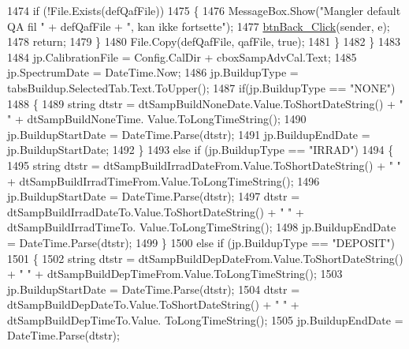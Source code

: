 \begin{DoxyCode}
1474                     \textcolor{keywordflow}{if} (!File.Exists(defQafFile))
1475                     \{
1476                         MessageBox.Show(\textcolor{stringliteral}{"Mangler default QA fil "} + defQafFile + \textcolor{stringliteral}{", kan ikke fortsette"});
1477                         \hyperlink{class_scintilab_1_1_form_main_aca32a54e95297f770c9022441cb74a90}{btnBack\_Click}(sender, e);
1478                         \textcolor{keywordflow}{return};
1479                     \}
1480                     File.Copy(defQafFile, qafFile, \textcolor{keyword}{true});
1481                 \}
1482             \}
1483 
1484             jp.CalibrationFile = Config.CalDir + cboxSampAdvCal.Text;
1485             jp.SpectrumDate = DateTime.Now;
1486             jp.BuildupType = tabsBuildup.SelectedTab.Text.ToUpper();
1487             \textcolor{keywordflow}{if}(jp.BuildupType == \textcolor{stringliteral}{"NONE"})
1488             \{
1489                 \textcolor{keywordtype}{string} dtstr = dtSampBuildNoneDate.Value.ToShortDateString() + \textcolor{stringliteral}{" "} + dtSampBuildNoneTime.
      Value.ToLongTimeString();
1490                 jp.BuildupStartDate = DateTime.Parse(dtstr);
1491                 jp.BuildupEndDate = jp.BuildupStartDate; 
1492             \}
1493             \textcolor{keywordflow}{else} \textcolor{keywordflow}{if} (jp.BuildupType == \textcolor{stringliteral}{"IRRAD"})
1494             \{
1495                 \textcolor{keywordtype}{string} dtstr = dtSampBuildIrradDateFrom.Value.ToShortDateString() + \textcolor{stringliteral}{" "} + 
      dtSampBuildIrradTimeFrom.Value.ToLongTimeString();
1496                 jp.BuildupStartDate = DateTime.Parse(dtstr);
1497                 dtstr = dtSampBuildIrradDateTo.Value.ToShortDateString() + \textcolor{stringliteral}{" "} + dtSampBuildIrradTimeTo.
      Value.ToLongTimeString();
1498                 jp.BuildupEndDate = DateTime.Parse(dtstr);
1499             \}
1500             \textcolor{keywordflow}{else} \textcolor{keywordflow}{if} (jp.BuildupType == \textcolor{stringliteral}{"DEPOSIT"})
1501             \{
1502                 \textcolor{keywordtype}{string} dtstr = dtSampBuildDepDateFrom.Value.ToShortDateString() + \textcolor{stringliteral}{" "} + 
      dtSampBuildDepTimeFrom.Value.ToLongTimeString();
1503                 jp.BuildupStartDate = DateTime.Parse(dtstr);
1504                 dtstr = dtSampBuildDepDateTo.Value.ToShortDateString() + \textcolor{stringliteral}{" "} + dtSampBuildDepTimeTo.Value.
      ToLongTimeString();
1505                 jp.BuildupEndDate = DateTime.Parse(dtstr);

\end{DoxyCode}
